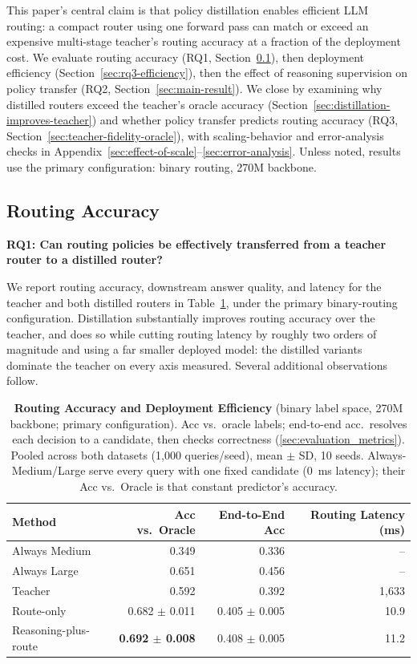 \documentclass{article}
\begin{document}
This paper's central claim is that policy distillation enables efficient LLM routing: a compact router using one forward pass can match or exceed an expensive multi-stage teacher's routing accuracy at a fraction of the deployment cost. We evaluate routing accuracy (RQ1, Section~\ref{sec:can-be-distilled}), then deployment efficiency (Section~\ref{sec:rq3-efficiency}), then the effect of reasoning supervision on policy transfer (RQ2, Section~\ref{sec:main-result}). We close by examining why distilled routers exceed the teacher's oracle accuracy (Section~\ref{sec:distillation-improves-teacher}) and whether policy transfer predicts routing accuracy (RQ3, Section~\ref{sec:teacher-fidelity-oracle}), with scaling-behavior and error-analysis checks in Appendix~\ref{sec:effect-of-scale}--\ref{sec:error-analysis}. Unless noted, results use the primary configuration: binary routing, 270M backbone.
\subsection{Routing Accuracy}
\label{sec:can-be-distilled}

\textbf{RQ1: Can routing policies be effectively transferred from a teacher router to a distilled router?}

We report routing accuracy, downstream answer quality, and latency for
the teacher and both distilled routers in Table~\ref{tab:mainperf},
under the primary binary-routing configuration. Distillation
substantially improves routing accuracy over the teacher, and does so
while cutting routing latency by roughly two orders of magnitude and
using a far smaller deployed model: the distilled variants dominate
the teacher on every axis measured. Several additional observations
follow.

\begin{table}[h]
\centering
\caption{\textbf{Routing Accuracy and Deployment Efficiency} (binary
label space, 270M backbone; primary configuration). Acc vs.\ oracle
labels; end-to-end acc.\ resolves each decision to a candidate, then
checks correctness (\ref{sec:evaluation_metrics}). Pooled across both
datasets (1,000 queries/seed), mean $\pm$ SD, 10 seeds.
Always-Medium/Large serve every query with one fixed candidate
(0~ms latency); their Acc vs.\ Oracle is that constant predictor's
accuracy.}
\label{tab:mainperf}
\begin{tabular}{@{}lrrr@{}}
\toprule
Method & Acc vs.\ Oracle & End-to-End Acc & Routing Latency (ms) \\
\midrule
Always Medium & 0.349 & 0.336 & -- \\
Always Large & 0.651 & 0.456 & -- \\
Teacher & 0.592 & 0.392 & 1{,}633 \\
Route-only & 0.682 $\pm$ 0.011 & 0.405 $\pm$ 0.005 & 10.9 \\
Reasoning-plus-route & \textbf{0.692 $\pm$ 0.008} & 0.408 $\pm$ 0.005 & 11.2 \\
\bottomrule
\end{tabular}
\end{table}
\end{document}

